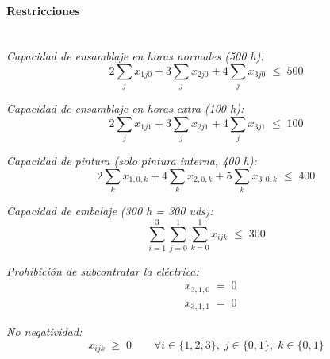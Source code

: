 \paragraph{Restricciones}\mbox{}\\
\textit{Capacidad de ensamblaje en horas normales (500 h):}
\begin{equation}
2\sum_{j} x_{1j0} + 3\sum_{j} x_{2j0} + 4\sum_{j} x_{3j0} \;\leq\; 500
\end{equation}

\textit{Capacidad de ensamblaje en horas extra (100 h):}
\begin{equation}
2\sum_{j} x_{1j1} + 3\sum_{j} x_{2j1} + 4\sum_{j} x_{3j1} \;\leq\; 100
\end{equation}

\textit{Capacidad de pintura (solo pintura interna, 400 h):}
\begin{equation}
2\sum_{k} x_{1,0,k} + 4\sum_{k} x_{2,0,k} + 5\sum_{k} x_{3,0,k} \;\leq\; 400
\end{equation}

\textit{Capacidad de embalaje (300 h = 300 uds):}
\begin{equation}
\sum_{i=1}^{3}\sum_{j=0}^{1}\sum_{k=0}^{1} x_{ijk} \;\leq\; 300
\end{equation}

\textit{Prohibición de subcontratar la eléctrica:}
\begin{align}
& x_{3,1,0} \;=\; 0 \\
& x_{3,1,1} \;=\; 0
\end{align}

\textit{No negatividad:}
\begin{equation}
x_{ijk} \;\geq\; 0 \qquad \forall i\in\{1,2,3\},\; j\in\{0,1\},\; k\in\{0,1\}
\end{equation}







